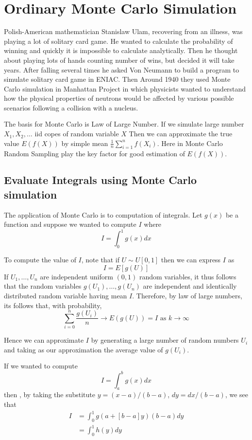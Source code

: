 \chapter{Ordinary Monte Carlo Simulation}
Polish-American mathematician Stanislaw Ulam, recovering from an illness, was playing a lot of
solitary card game. He wanted to calculate the probability of winning and
quickly it is impossible to calculate analytically. Then he thought about playing
lots of hands counting number of wins, but decided it will take years.
After falling several times he asked Von Neumann to build a program to simulate solitary
card game in ENIAC. Then Around 1940 they used Monte Carlo simulation in Manhattan Project
in which physicists wanted to understand how the physical
properties of neutrons would be affected by various possible scenarios following a
collision with a nucleus.

The basis for Monte Carlo is Law of Large Number. If we simulate large number $X_1, X_2, \ldots$ iid
copes of random variable $X$ Then we can approximate the true value $E(f(X))$ by simple mean
$\frac{1}{n}\sum_{i=1}^{n} f(X_i)$. Here in Monte Carlo Random Sampling play the key factor for good estimation of $E(f(X))$.

\section{Evaluate Integrals using Monte Carlo simulation}
The application of Monte Carlo is to computation of integrals. Let $g(x)$ be a function
and suppose we wanted to compute $I$ where
\[
	I = \int_{0}^{1} g(x) dx
\]

To compute the value of $I$, note that if $U\sim U[0,1]$ then we can express $I$ as
\[
	I = E[g(U)]
\]
If $U_1, \ldots, U_n$ are independent uniform $(0,1)$ random variables, it thus follows that
the random variables $g(U_1),\ldots,g(U_n)$ are independent and identically distributed random
variable having mean $I$. Therefore, by law of large numbers, its follows that,
with probability,
\[
	\sum_{i = 0}^{n} \frac{g(U_i)}{n} \to E(g(U))= I \text{ as } k \to \infty
\]

Hence we can approximate $I$ by generating a large number of random numbers $U_i$ and taking
as our approximation the average value of $g(U_i)$.

If we wanted to compute
\[
	I = \int_{a}^{b} g(x) dx
\]
then , by taking the substitute $y=(x-a)/(b-a)$, $dy = dx/(b-a)$, we see that
\begin{align*}
	I & = \int_{0}^{1} g(a+[b-a]y)(b-a)dy \\
	  & = \int_{ 0}^{1} h(y) dy
\end{align*}

